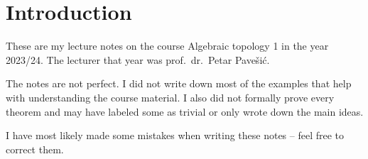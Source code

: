 \section*{Introduction}

These are my lecture notes on the course Algebraic topology 1 in the
year 2023/24. The lecturer that year was prof.~dr.~Petar Pavešić.

The notes are not perfect. I did not write down most of the examples
that help with understanding the course material. I also did not
formally prove every theorem and may have labeled some as trivial or
only wrote down the main ideas.

I have most likely made some mistakes when writing these notes --
feel free to correct them.
